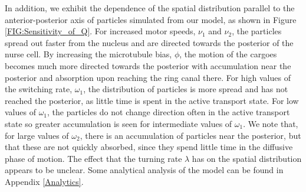 \documentclass[twocolumn]{biophys}
\newlength\tindent
\renewcommand{\indent}{\hspace*{\tindent}}
\begin{document}
\indent In addition, we exhibit the dependence of the spatial distribution parallel to the anterior-posterior axis of particles simulated from our model, as shown in Figure \ref{FIG:Sensitivity_of_Q}.
For increased motor speeds, $\nu_1$ and $\nu_2$, the particles spread out faster from the nucleus and are directed towards the posterior of the nurse cell.
By increasing the microtubule bias, $\phi$, the motion of the cargoes becomes much more directed towards the posterior with accumulation near the posterior and absorption upon reaching the ring canal there.
For high values of the switching rate, $\omega_1$, the distribution of particles is more spread and has not reached the posterior, as little time is spent in the active transport state.
For low values of $\omega_1$, the particles do not change direction often in the active transport state so greater accumulation is seen for intermediate values of $\omega_1$.
We note that, for large values of $\omega_2$, there is an accumulation of particles near the posterior, but that these are not quickly absorbed, since they spend little time in the diffusive phase of motion.
The effect that the turning rate $\lambda$ has on the spatial distribution appears to be unclear.
Some analytical analysis of the model can be found in Appendix \ref{Analytics}.
\end{document}
